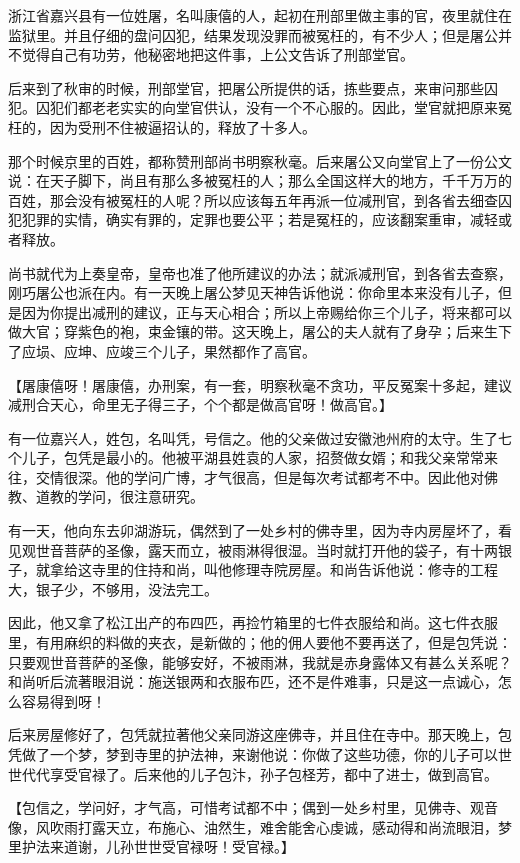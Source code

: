 \documentclass[12pt,twoside,openany]{book}
\newcommand{\kai}[1]{{\CJKfamily{kai}#1}}
\begin{document}
浙江省嘉兴县有一位姓屠，名叫康僖的人，起初在刑部里做主事的官，夜里就住在监狱里。并且仔细的盘问囚犯，结果发现没罪而被冤枉的，有不少人；但是屠公并不觉得自己有功劳，他秘密地把这件事，上公文告诉了刑部堂官。

后来到了秋审的时候，刑部堂官，把屠公所提供的话，拣些要点，来审问那些囚犯。囚犯们都老老实实的向堂官供认，没有一个不心服的。因此，堂官就把原来冤枉的，因为受刑不住被逼招认的，释放了十多人。

那个时候京里的百姓，都称赞刑部尚书明察秋毫。后来屠公又向堂官上了一份公文说：在天子脚下，尚且有那么多被冤枉的人；那么全国这样大的地方，千千万万的百姓，那会没有被冤枉的人呢？所以应该每五年再派一位减刑官，到各省去细查囚犯犯罪的实情，确实有罪的，定罪也要公平；若是冤枉的，应该翻案重审，减轻或者释放。

尚书就代为上奏皇帝，皇帝也准了他所建议的办法；就派减刑官，到各省去查察，刚巧屠公也派在内。有一天晚上屠公梦见天神告诉他说：你命里本来没有儿子，但是因为你提出减刑的建议，正与天心相合；所以上帝赐给你三个儿子，将来都可以做大官；穿紫色的袍，束金镶的带。这天晚上，屠公的夫人就有了身孕；后来生下了应埙、应坤、应竣三个儿子，果然都作了高官。

【\kai{屠康僖呀！屠康僖，办刑案，有一套，明察秋毫不贪功，平反冤案十多起，建议减刑合天心，命里无子得三子，个个都是做高官呀！做高官。}】

有一位嘉兴人，姓包，名叫凭，号信之。他的父亲做过安徽池州府的太守。生了七个儿子，包凭是最小的。他被平湖县姓袁的人家，招赘做女婿；和我父亲常常来往，交情很深。他的学问广博，才气很高，但是每次考试都考不中。因此他对佛教、道教的学问，很注意研究。

有一天，他向东去卯湖游玩，偶然到了一处乡村的佛寺里，因为寺内房屋坏了，看见观世音菩萨的圣像，露天而立，被雨淋得很湿。当时就打开他的袋子，有十两银子，就拿给这寺里的住持和尚，叫他修理寺院房屋。和尚告诉他说：修寺的工程大，银子少，不够用，没法完工。

因此，他又拿了松江出产的布四匹，再捡竹箱里的七件衣服给和尚。这七件衣服里，有用麻织的料做的夹衣，是新做的；他的佣人要他不要再送了，但是包凭说：只要观世音菩萨的圣像，能够安好，不被雨淋，我就是赤身露体又有甚么关系呢？和尚听后流著眼泪说：施送银两和衣服布匹，还不是件难事，只是这一点诚心，怎么容易得到呀！

后来房屋修好了，包凭就拉著他父亲同游这座佛寺，并且住在寺中。那天晚上，包凭做了一个梦，梦到寺里的护法神，来谢他说：你做了这些功德，你的儿子可以世世代代享受官禄了。后来他的儿子包汴，孙子包柽芳，都中了进士，做到高官。

【\kai{包信之，学问好，才气高，可惜考试都不中；偶到一处乡村里，见佛寺、观音像，风吹雨打露天立，布施心、油然生，难舍能舍心虔诚，感动得和尚流眼泪，梦里护法来道谢，儿孙世世受官禄呀！受官禄。}】
\end{document}
